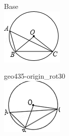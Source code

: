 \documentclass[12pt]{article}
\begin{document}
\begin{center}
\begin{minipage}{0.32\textwidth}\centering
Base\\
\includegraphics[width=0.95\linewidth]{out_rommath_origin/items/geo435-origin/assets/figure.png}
\end{minipage}
\hfill\begin{minipage}{0.32\textwidth}\centering
geo435-origin\_rot30\\
\includegraphics[width=0.95\linewidth]{out_rommath_origin/items/geo435-origin/assets/figure_rot30.png}

\end{minipage}
\end{center}
\end{document}
